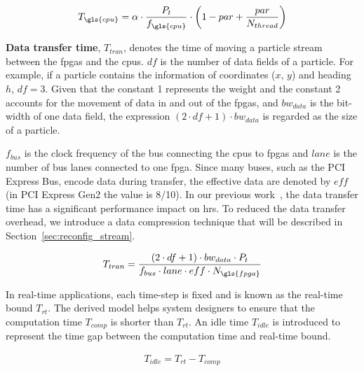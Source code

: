 \begin{equation}
\begin{aligned}
T_{\gls{cpu}} = \alpha \cdot \frac{P_t}{f_{\gls{cpu}}} \cdot \left(1-par+\frac{par}{N_{thread}}\right)
\end{aligned}
\label{eqt:host}
\end{equation}

\textbf{Data transfer time}, $T_{tran}$, denotes the time of moving a particle stream between the \gls{fpga}s and the \gls{cpu}s.
$df$ is the number of data fields of a particle.
For example, if a particle contains the information of coordinates ($x$, $y$) and heading $h$, $df=3$.
Given that the constant 1 represents the weight and the constant 2 accounts for the movement of data in and out of the \gls{fpga}s,
and $bw_{data}$ is the bit-width of one data field, the expression $(2 \cdot df + 1) \cdot bw_{data}$ is regarded as the size of a particle.

$f_{bus}$ is the clock frequency of the bus connecting the \gls{cpu}s to \gls{fpga}s and $lane$ is the number of bus lanes connected to one \gls{fpga}.
Since many buses, such as the PCI Express Bus, encode data during transfer, the effective data are denoted by $eff$ (in PCI Express Gen2 the value is 8/10).
In our previous work~\cite{chau13arc}, the data transfer time has a significant performance impact on \gls{hrs}.
To reduced the data transfer overhead, we introduce a data compression technique that will be described in Section~\ref{sec:reconfig_stream}.

\begin{equation}
\begin{aligned}
T_{tran} = \frac{(2 \cdot df + 1) \cdot bw_{data} \cdot P_t}{f_{bus} \cdot lane \cdot eff \cdot N_{\gls{fpga}}}
\end{aligned}
\label{eqt:data}
\end{equation}

In real-time applications, each time-step is fixed and is known as the real-time bound $T_{rt}$.
The derived model helps system designers to ensure that the computation time $T_{comp}$ is shorter than $T_{rt}$.
An idle time $T_{idle}$ is introduced to represent the time gap between the computation time and real-time bound.

\begin{equation}
\begin{aligned}
T_{idle} = T_{rt} - T_{comp}
\end{aligned}
\label{eqt:idle}
\end{equation}

